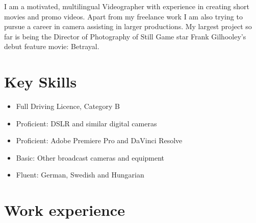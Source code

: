\documentclass[10pt,a4paper,roman]{moderncv}
\title{\jobtitle}
\newcommand{\jobtitle}{Videographer}
\begin{document}
\makecvtitle

\vspace{-2.5em}

I am a motivated, multilingual \jobtitle{} with experience in creating short movies and promo videos. Apart from my freelance work I am also trying to pursue a career in camera assisting in larger productions. My largest project so far is being the Director of Photography of Still Game star Frank Gilhooley's debut feature movie: Betrayal.

\section{Key Skills}
\vspace{-1em}
\begin{multicols}{2}
\begin{itemize}
\item Full Driving Licence, Category B
\item Proficient: DSLR and similar digital cameras
\item Proficient: Adobe Premiere Pro and DaVinci Resolve
\item Basic: Other broadcast cameras and equipment
\item Fluent: German, Swedish and Hungarian
\end{itemize}
\end{multicols}

\section{Work experience}

\end{document}
